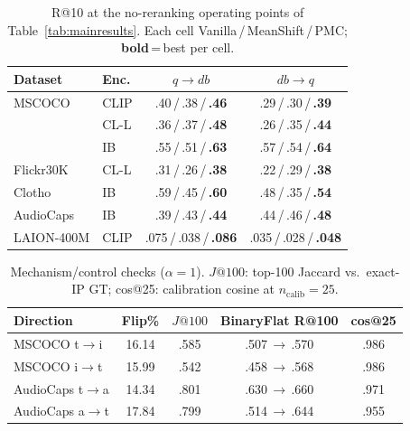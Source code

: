 \begin{table}[t]
\caption{R@10 at the no-reranking operating points of Table~\ref{tab:mainresults}. Each cell Vanilla\,/\,MeanShift\,/\,PMC; \textbf{bold}\,=\,best per cell.}\label{tab:r10}
\centering
{\small
\begin{tabular*}{\columnwidth}{@{\extracolsep{\fill}}ll cc@{}}
\toprule
\textbf{Dataset} & \textbf{Enc.} & $q{\to}db$ & $db{\to}q$ \\
\midrule
MSCOCO     & CLIP & .40\,/\,.38\,/\,\textbf{.46} & .29\,/\,.30\,/\,\textbf{.39} \\
           & CL-L & .36\,/\,.37\,/\,\textbf{.48} & .26\,/\,.35\,/\,\textbf{.44} \\
           & IB   & .55\,/\,.51\,/\,\textbf{.63} & .57\,/\,.54\,/\,\textbf{.64} \\
Flickr30K  & CL-L & .31\,/\,.26\,/\,\textbf{.38} & .22\,/\,.29\,/\,\textbf{.38} \\
Clotho     & IB   & .59\,/\,.45\,/\,\textbf{.60} & .48\,/\,.35\,/\,\textbf{.54} \\
AudioCaps  & IB   & .39\,/\,.43\,/\,\textbf{.44} & .44\,/\,.46\,/\,\textbf{.48} \\
LAION-400M & CLIP & .075\,/\,.038\,/\,\textbf{.086} & .035\,/\,.028\,/\,\textbf{.048} \\
\bottomrule
\end{tabular*}}
\end{table}

\begin{table}[t]
\caption{Mechanism/control checks ($\alpha{=}1$). $J@100$: top-100 Jaccard vs.\ exact-IP GT; cos@25: calibration cosine at $n_\mathrm{calib}{=}25$.}\label{tab:mechanism}
\centering
{\small
\begin{tabular*}{\columnwidth}{@{\extracolsep{\fill}}lcccc@{}}
\toprule
\textbf{Direction} & \textbf{Flip\%} & \textbf{$J@100$} & \textbf{BinaryFlat R@100} & \textbf{cos@25} \\
\midrule
MSCOCO t$\to$i    & 16.14 & .585 & .507\,$\to$\,.570 & .986 \\
MSCOCO i$\to$t    & 15.99 & .542 & .458\,$\to$\,.568 & .986 \\
AudioCaps t$\to$a & 14.34 & .801 & .630\,$\to$\,.660 & .971 \\
AudioCaps a$\to$t & 17.84 & .799 & .514\,$\to$\,.644 & .955 \\
\bottomrule
\end{tabular*}%
}
\end{table}

